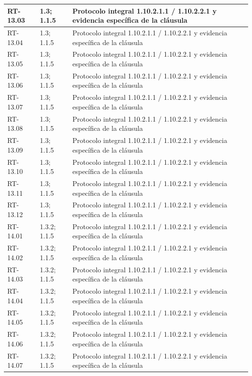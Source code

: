 \begin{longtable}{L{23mm}L{46mm}L{72mm}}
RT-13.03 & 1.3; 1.1.5 & Protocolo integral 1.10.2.1.1 / 1.10.2.2.1 y evidencia específica de la cláusula\\\hline
RT-13.04 & 1.3; 1.1.5 & Protocolo integral 1.10.2.1.1 / 1.10.2.2.1 y evidencia específica de la cláusula\\\hline
RT-13.05 & 1.3; 1.1.5 & Protocolo integral 1.10.2.1.1 / 1.10.2.2.1 y evidencia específica de la cláusula\\\hline
RT-13.06 & 1.3; 1.1.5 & Protocolo integral 1.10.2.1.1 / 1.10.2.2.1 y evidencia específica de la cláusula\\\hline
RT-13.07 & 1.3; 1.1.5 & Protocolo integral 1.10.2.1.1 / 1.10.2.2.1 y evidencia específica de la cláusula\\\hline
RT-13.08 & 1.3; 1.1.5 & Protocolo integral 1.10.2.1.1 / 1.10.2.2.1 y evidencia específica de la cláusula\\\hline
RT-13.09 & 1.3; 1.1.5 & Protocolo integral 1.10.2.1.1 / 1.10.2.2.1 y evidencia específica de la cláusula\\\hline
RT-13.10 & 1.3; 1.1.5 & Protocolo integral 1.10.2.1.1 / 1.10.2.2.1 y evidencia específica de la cláusula\\\hline
RT-13.11 & 1.3; 1.1.5 & Protocolo integral 1.10.2.1.1 / 1.10.2.2.1 y evidencia específica de la cláusula\\\hline
RT-13.12 & 1.3; 1.1.5 & Protocolo integral 1.10.2.1.1 / 1.10.2.2.1 y evidencia específica de la cláusula\\\hline
RT-14.01 & 1.3.2; 1.1.5 & Protocolo integral 1.10.2.1.1 / 1.10.2.2.1 y evidencia específica de la cláusula\\\hline
RT-14.02 & 1.3.2; 1.1.5 & Protocolo integral 1.10.2.1.1 / 1.10.2.2.1 y evidencia específica de la cláusula\\\hline
RT-14.03 & 1.3.2; 1.1.5 & Protocolo integral 1.10.2.1.1 / 1.10.2.2.1 y evidencia específica de la cláusula\\\hline
RT-14.04 & 1.3.2; 1.1.5 & Protocolo integral 1.10.2.1.1 / 1.10.2.2.1 y evidencia específica de la cláusula\\\hline
RT-14.05 & 1.3.2; 1.1.5 & Protocolo integral 1.10.2.1.1 / 1.10.2.2.1 y evidencia específica de la cláusula\\\hline
RT-14.06 & 1.3.2; 1.1.5 & Protocolo integral 1.10.2.1.1 / 1.10.2.2.1 y evidencia específica de la cláusula\\\hline
RT-14.07 & 1.3.2; 1.1.5 & Protocolo integral 1.10.2.1.1 / 1.10.2.2.1 y evidencia específica de la cláusula\\\hline

\end{longtable}
